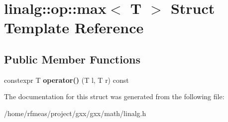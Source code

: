 \hypertarget{structlinalg_1_1op_1_1max}{}\section{linalg\+:\+:op\+:\+:max$<$ T $>$ Struct Template Reference}
\label{structlinalg_1_1op_1_1max}
\subsection*{Public Member Functions}
\begin{DoxyCompactItemize}
\item 
constexpr T {\bfseries operator()} (T l, T r) const \hypertarget{structlinalg_1_1op_1_1max_a7488190cd0a5a458c815a1f6f72fe70c}{}\label{structlinalg_1_1op_1_1max_a7488190cd0a5a458c815a1f6f72fe70c}

\end{DoxyCompactItemize}


The documentation for this struct was generated from the following file\+:\begin{DoxyCompactItemize}
\item 
/home/rfmeas/project/gxx/gxx/math/linalg.\+h\end{DoxyCompactItemize}
